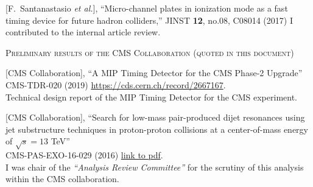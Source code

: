 \documentclass[10pt, a4paper]{article}
\begin{document}
\begin{thebibliography}{599}
[F.~Santanastasio {\it et al.}],
``Micro-channel plates in ionization mode as a fast timing device for future hadron colliders,''
JINST \textbf{12}, no.08, C08014 (2017)
I contributed to the internal article review.


\vspace{0.1cm} \begin{center} \textsc{Preliminary results of the CMS
    Collaboration (quoted in this document)} \end{center} \vspace{0.05cm}

  [CMS Collaboration], 
  ``A MIP Timing Detector for the CMS Phase-2 Upgrade''\\
  CMS-TDR-020 (2019)
  \href{https://cds.cern.ch/record/2667167}{https://cds.cern.ch/record/2667167}.
  \\ Technical design report of the MIP Timing Detector for the CMS experiment.

  [CMS Collaboration], 
  ``Search for low-mass
  pair-produced dijet resonances using jet substructure techniques in
  proton-proton collisions at a center-of-mass energy of $\sqrt{s}=13$
  TeV''\\
  CMS-PAS-EXO-16-029 (2016)
  \href{http://cds.cern.ch/record/2231062/files/EXO-16-029-pas.pdf}{link
    to pdf}.
  \\ I was chair of the {\it``Analysis Review Committee''} for the scrutiny of this analysis within the CMS collaboration. 



\end{thebibliography}
\end{document}
